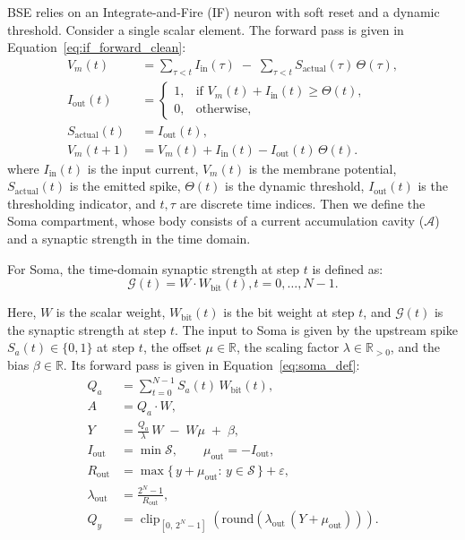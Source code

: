 \documentclass{article}
\theoremstyle{plain}
\theoremstyle{definition}
\theoremstyle{remark}
\begin{document}
BSE relies on an Integrate-and-Fire (IF) neuron with soft reset and a dynamic threshold. Consider a single scalar element. The forward pass is given in Equation~\ref{eq:if_forward_clean}:
\begin{equation}
\label{eq:if_forward_clean}
\begin{aligned}
V_m(t) &= \sum_{\tau<t} I_{\mathrm{in}}(\tau)\;-\;\sum_{\tau<t} S_{\mathrm{actual}}(\tau)\,\Theta(\tau),\\
I_{\mathrm{out}}(t) &=
\begin{cases}
1, & \text{if } V_m(t)+I_{\mathrm{in}}(t)\ge \Theta(t),\\
0, & \text{otherwise},
\end{cases}\\
S_{\mathrm{actual}}(t) &= I_{\mathrm{out}}(t),\\
V_m(t{+}1) &= V_m(t)+I_{\mathrm{in}}(t)-I_{\mathrm{out}}(t)\,\Theta(t).
\end{aligned}
\end{equation}
where $I_{\mathrm{in}}(t)$ is the input current, $V_m(t)$ is the membrane potential, $S_{\mathrm{actual}}(t)$ is the emitted spike, $\Theta(t)$ is the dynamic threshold, $I_{\mathrm{out}}(t)$ is the thresholding indicator, and $t,\tau$ are discrete time indices. Then we define the Soma compartment, whose body consists of a current accumulation cavity ($\mathcal{A}$) and a synaptic strength in the time domain.

For Soma, the time-domain synaptic strength at step $t$ is defined as:
\begin{equation}
\mathcal{G}(t) = W \cdot W_{\mathrm{bit}}(t), t=0,\dots,N-1.
\end{equation}

Here, $W$ is the scalar weight, $W_{\mathrm{bit}}(t)$ is the bit weight at step $t$, and $\mathcal{G}(t)$ is the synaptic strength at step $t$. The input to Soma is given by the upstream spike $S_a(t)\in\{0,1\}$ at step $t$, the offset $\mu\in\mathbb{R}$, the scaling factor $\lambda\in\mathbb{R}_{>0}$, and the bias $\beta\in\mathbb{R}$. Its forward pass is given  in Equation~\ref{eq:soma_def}:
\begin{equation}
\label{eq:soma_def}
\begin{aligned}
Q_a &= \sum_{t=0}^{N-1} S_a(t)\,W_{\mathrm{bit}}(t),\\
A &= Q_a \cdot W,\\
Y &= \frac{Q_a}{\lambda}\,W \;-\; W\mu \;+\;\beta,\\
I_{\mathrm{out}} &= \min \mathcal{S},\qquad \mu_{\mathrm{out}}=-I_{\mathrm{out}},\\
R_{\mathrm{out}} &= \max\{\,y+\mu_{\mathrm{out}}:\, y\in\mathcal{S}\,\}+\varepsilon,\qquad\\
\lambda_{\mathrm{out}}&=\frac{2^N-1}{R_{\mathrm{out}}},\\
Q_y &= \operatorname{clip}_{[0,\,2^N-1]}\!\left(\mathrm{round}\!\left(\lambda_{\mathrm{out}}\,(Y+\mu_{\mathrm{out}})\right)\right).
\end{aligned}
\end{equation}
\end{document}
